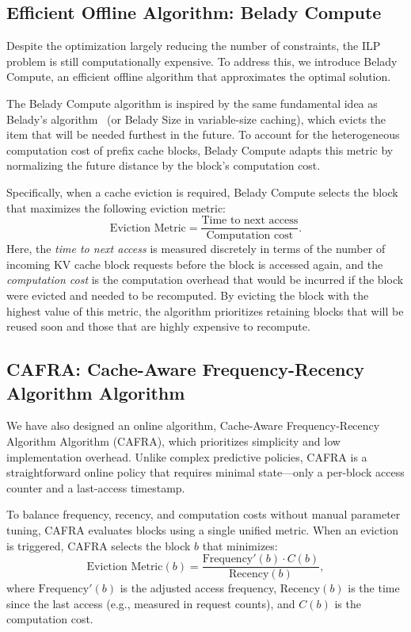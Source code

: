 \documentclass[letterpaper,twocolumn,10pt]{article}
\newcommand{\algo}{CAFRA\xspace}
\newcommand{\algofull}{Cache-Aware Frequency-Recency Algorithm\xspace}
\begin{document}
\subsection{Efficient Offline Algorithm: Belady Compute}

Despite the optimization largely reducing the number of constraints, the ILP
problem is still computationally expensive. To address this, we introduce
Belady Compute, an efficient offline algorithm that approximates the optimal
solution.

The Belady Compute algorithm is inspired by the same fundamental idea as
Belady's algorithm~\cite{belady1966study, mattson1970evaluation}
(or Belady Size in variable-size caching), which evicts the
item that will be needed furthest in the future. To account for the
heterogeneous computation cost of prefix cache blocks, Belady Compute adapts
this metric by normalizing the future distance by the block's computation cost.

Specifically, when a cache eviction is required, Belady Compute selects the
block that maximizes the following eviction metric:
\begin{equation}
    \text{Eviction Metric} = \frac{\text{Time to next access}}{\text{Computation cost}}.
\end{equation}
Here, the \emph{time to next access} is measured discretely in terms 
of the number of incoming KV cache block requests before the block is
accessed again, and the \emph{computation cost} is the computation overhead
that would be incurred if the block were evicted and needed to be recomputed.
By evicting the block with the highest value of this metric, the algorithm
prioritizes retaining blocks that will be reused soon and those that are
highly expensive to recompute.



\subsection{\algo{}: \algofull{} Algorithm}

We have also designed an online algorithm, \algofull Algorithm (\algo),
which prioritizes simplicity and low implementation overhead. Unlike complex
predictive policies, \algo is a straightforward online policy that requires
minimal state—only a per-block access counter and a last-access timestamp.

To balance frequency, recency, and computation costs without manual parameter
tuning, \algo evaluates blocks using a single unified metric. When an
eviction is triggered, \algo selects the block $b$ that minimizes:
\begin{equation}
    \text{Eviction Metric}(b) = \frac{\text{Frequency}'(b) \cdot C(b)}{\text{Recency}(b)},
\end{equation}
where $\text{Frequency}'(b)$ is the adjusted access frequency, $\text{Recency}(b)$ is
the time since the last access (e.g., measured in request counts), and $C(b)$
is the computation cost.
\end{document}

